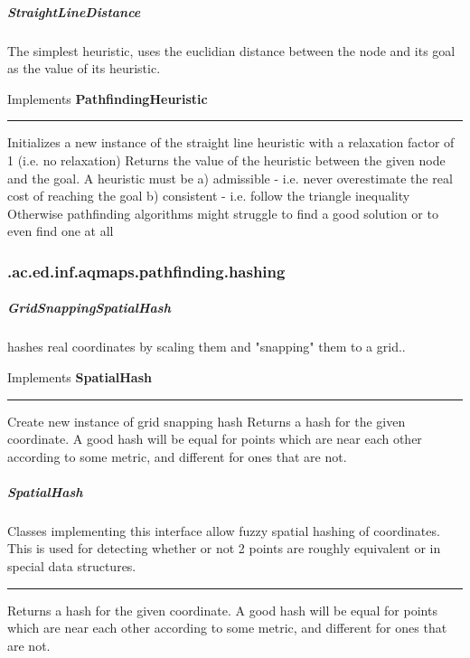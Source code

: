 \subparagraph{ StraightLineDistance } The simplest heuristic, uses the euclidian distance between the node and its goal as the value of its heuristic.
 
Implements \textbf{ PathfindingHeuristic }
\hrule
\begin{mitem}
\scriptsize
	{Initializes a new instance of the straight line heuristic with a relaxation factor of 1 (i.e. no relaxation)}
	{Returns the value of the heuristic between the given node and the goal. A heuristic must be \newline%
 a) admissible {-} i.e. never overestimate the real cost of reaching the goal\newline%
 b) consistent {-} i.e. follow the triangle inequality\newline%
 Otherwise pathfinding algorithms might struggle to find a good solution or to even find one at all}
\end{mitem}

\subsubsection{ .ac.ed.inf.aqmaps.pathfinding.hashing }
\subparagraph{ GridSnappingSpatialHash } hashes real coordinates by scaling them and "snapping" them to a grid..
 
Implements \textbf{ SpatialHash }
\hrule
\begin{mitem}
\scriptsize
	{Create new instance of grid snapping hash}
	{Returns a hash for the given coordinate. A good hash will be equal for points which are near each other\newline%
 according to some metric, and different for ones that are not.}
\end{mitem}

\subparagraph{ SpatialHash } Classes implementing this interface allow fuzzy spatial hashing of coordinates. This is used for
 detecting whether or not 2 points are roughly equivalent or in special data structures.
 
\hrule
\begin{mitem}
\scriptsize
	{Returns a hash for the given coordinate. A good hash will be equal for points which are near each other\newline%
 according to some metric, and different for ones that are not.}
\end{mitem}

